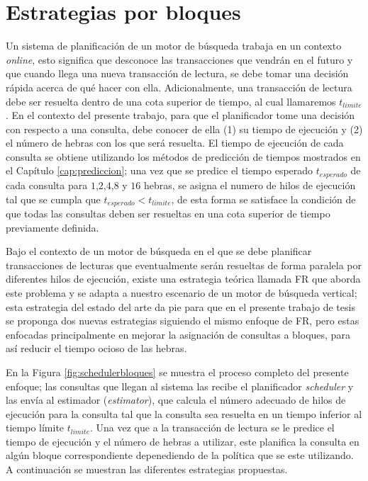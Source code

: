 \section{Estrategias por bloques}
\label{scheduling:bloques}
Un sistema de planificación de un motor de búsqueda trabaja en un contexto \textit{online}, esto significa que desconoce las transacciones que vendrán en el futuro y que cuando llega una nueva transacción de lectura, se debe tomar una decisión rápida acerca de qué hacer con ella. Adicionalmente, una transacción de lectura debe ser resuelta dentro de una cota superior de tiempo, al cual llamaremos $t_{limite}$. En el contexto del presente trabajo, para que el planificador tome una decisión con respecto a una consulta, debe conocer de ella (1) su tiempo de ejecución y (2) el número de hebras con los que será resuelta. El tiempo de ejecución de cada consulta se obtiene utilizando los métodos de predicción de tiempos mostrados en el Capítulo \ref{cap:prediccion}; una vez que se predice el tiempo esperado $t_{esperado}$ de cada consulta para $1$,$2$,$4$,$8$ y $16$ hebras, se asigna el numero de hilos de ejecución tal que se cumpla que $t_{esperado} < t_{limite}$, de esta forma se satisface la condición de que todas las consultas deben ser resueltas en una cota superior de tiempo previamente definida.

Bajo el contexto de un motor de búsqueda en el que se debe planificar transacciones de lecturas que eventualmente serán resueltas de forma paralela por diferentes hilos de ejecución, existe una estrategia teórica llamada FR que aborda este problema \citep{Ye:2007} y se adapta a nuestro escenario de un motor de búsqueda vertical; esta estrategia del estado del arte da pie para que en el presente trabajo de tesis se proponga dos nuevas estrategias siguiendo el mismo enfoque de FR, pero estas enfocadas principalmente en mejorar la asignación de consultas a bloques, para así reducir el tiempo ocioso de las hebras. 

En la Figura \ref{fig:schedulerbloques} se muestra el proceso completo del presente enfoque; las consultas que llegan al sistema las recibe el planificador \textit{scheduler} y las envía al estimador (\textit{estimator}), que calcula el número adecuado de hilos de ejecución para la consulta tal que la consulta sea resuelta en un tiempo inferior al tiempo límite $t_{limite}$. Una vez que a la transacción de lectura se le predice el tiempo de ejecución y el número de hebras a utilizar, este planifica la consulta en algún bloque correspondiente depenediendo de la política que se este utilizando. A continuación se muestran las diferentes estrategias propuestas. 

